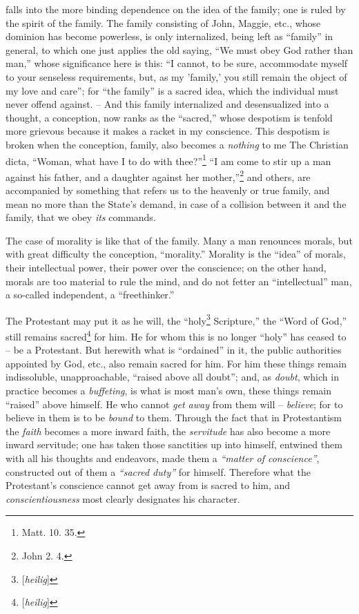 falls into the more binding dependence on the idea of the family; one is ruled 
by the spirit of the family. The family consisting of John, Maggie, etc., 
whose dominion has become powerless, is only internalized, being left as 
``family'' in general, to which one just applies the old saying, ``We must 
obey God rather than man,'' whose significance here is this: ``I cannot, to 
be sure, accommodate myself to your senseless requirements, but, as my 
'family,' you still remain the object of my love and care''; for ``the 
family'' is a sacred idea, which the individual must never offend against. -- 
And this family internalized and desensualized into a thought, a conception, 
now ranks as the ``sacred,'' whose despotism is tenfold more grievous 
because it makes a racket in my conscience. This despotism is broken when the 
conception, family, also becomes a \textit{nothing} to me The Christian dicta, 
``Woman, what have I to do with thee?''\footnote{Matt. 10. 35.} ``I am come 
to stir up a man against his father, and a daughter against her 
mother,''\footnote{John 2. 4.} and others, are accompanied by something that 
refers us to the heavenly or true family, and mean no more than the State's 
demand, in case of a collision between it and the family, that we obey 
\textit{its} commands.

The case of morality is like that of the family. Many a man renounces morals, 
but with great difficulty the conception, ``morality.'' Morality is the 
``idea'' of morals, their intellectual power, their power over the 
conscience; on the other hand, morals are too material to rule the mind, and 
do not fetter an ``intellectual'' man, a so-called independent, a 
``freethinker.''

The Protestant may put it as he will, the ``holy\footnote{[\textit{heilig}]} 
Scripture,'' the ``Word of God,'' still remains 
sacred\footnote{[\textit{heilig}]} for him. He for whom this is no longer 
``holy'' has ceased to -- be a Protestant. But herewith what is 
``ordained'' in it, the public authorities appointed by God, etc., also 
remain sacred for him. For him these things remain indissoluble, 
unapproachable, ``raised above all doubt''; and, as \textit{doubt}, which in 
practice becomes a \textit{buffeting}, is what is most man's own, these things 
remain ``raised'' above himself. He who cannot \textit{get away} from them 
will -- \textit{believe}; for to believe in them is to be \textit{bound} to 
them. Through the fact that in Protestantism the \textit{faith} becomes a more 
inward faith, the \textit{servitude} has also become a more inward servitude; 
one has taken those sanctities up into himself, entwined them with all his 
thoughts and endeavors, made them a \textit{``matter of conscience''}, 
constructed out of them a \textit{``sacred duty''} for himself. Therefore 
what the Protestant's conscience cannot get away from is sacred to him, and 
\textit{conscientiousness} most clearly designates his character.

